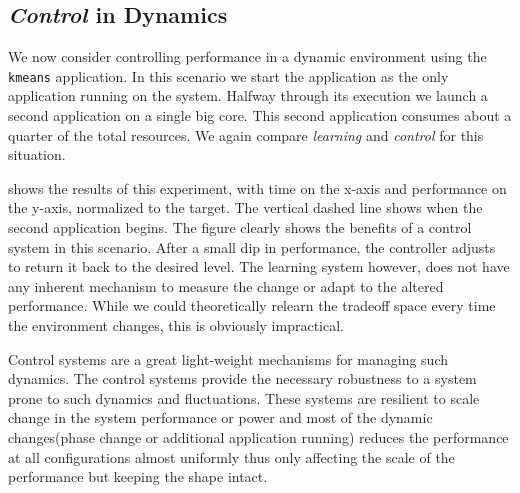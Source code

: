 
\subsection{\emph{Control} in Dynamics}
We now consider controlling performance in a dynamic environment using
the \texttt{kmeans} application.  In this scenario we start the
application as the only application running on the system.  Halfway
through its execution we launch a second application on a single big
core.  This second application consumes about a quarter of the total
resources.  We again compare \emph{learning} and \emph{control} for this situation.


 shows the results of this experiment, with
time on the x-axis and performance on the y-axis, normalized to the
target.  The vertical dashed line shows when the second application
begins.  The figure clearly shows the benefits of a control system in
this scenario.  After a small dip in performance, the controller
adjusts to return it back to the desired level.  The learning system
however, does not have any inherent mechanism to measure the change or
adapt to the altered performance.  While we could theoretically
relearn the tradeoff space every time the environment changes, this is
obviously impractical.  

Control systems are a great light-weight
mechanisms for managing such dynamics. The control systems provide the necessary robustness to a system prone to such dynamics and fluctuations. These systems are resilient to scale change in the system performance or power and most of the dynamic changes(phase change or additional application running) reduces the performance at all configurations almost uniformly thus only affecting the scale of the performance but keeping the shape intact. 

